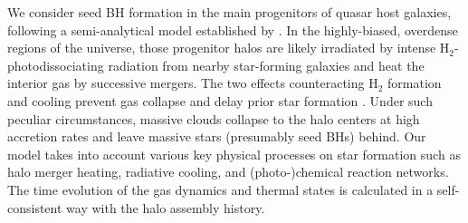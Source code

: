 \documentclass[twocolumn, twocolappendix]{aastex63}
\newcommand{\jlw}{J_{\rm LW}}
\begin{document}
\begin{CJK*}{UTF8}{gbsn}
We consider seed BH formation in the main progenitors of quasar host galaxies, following a semi-analytical model established by \citet{2021ApJ...917...60L}.
In the highly-biased, overdense regions of the universe, those progenitor halos are likely irradiated by intense H$_2$-photodissociating radiation 
from nearby star-forming galaxies and heat the interior gas by successive mergers. 
The two effects counteracting H$_2$ formation and cooling prevent gas collapse and delay prior star formation \citep[e.g.,][]{2014MNRAS.445..107V,2019Natur.566...85W}.
Under such peculiar circumstances, massive clouds collapse to the halo centers at high accretion rates and leave massive stars (presumably seed BHs) behind.
Our model takes into account various key physical processes on star formation such as halo merger heating, radiative cooling, and
(photo-)chemical reaction networks.
The time evolution of the gas dynamics and thermal states is calculated in a self-consistent way with the halo assembly history.
%



\end{CJK*}
\end{document}
